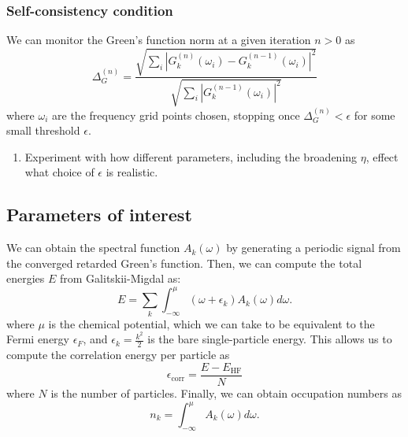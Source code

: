 \subsubsection{Self-consistency condition}
We can monitor the Green's function norm at a given iteration $n>0$ as
\begin{equation}
    \Delta_G^{(n)} = \frac{\sqrt{\sum_i |G_{k}^{(n)}(\omega_i) - G_{k}^{(n-1)}(\omega_i)|^2}}{\sqrt{\sum_i |G_{k}^{(n-1)}(\omega_i)|^2}}
\end{equation}
where $\omega_i$ are the frequency grid points chosen, stopping once $\Delta_G^{(n)} < \epsilon$ for some small threshold $\epsilon$.
\begin{enumerate}
    \item Experiment with how different parameters, including the broadening $\eta$, effect what choice of $\epsilon$ is realistic.
\end{enumerate}
\subsection{Parameters of interest}
We can obtain the spectral function $A_{k}(\omega)$ by generating a periodic signal from the converged retarded Green's function. Then, we can compute the total energies $E$ from Galitskii-Migdal as:
\begin{equation}
    E=\sum_k \int_{-\infty}^\mu\left(\omega+\epsilon_k\right) A_k(\omega) d \omega.
\end{equation}
where $\mu$ is the chemical potential, which we can take to be equivalent to the Fermi energy $\epsilon_F$, and $\epsilon_k=\frac{k^2}{2}$ is the bare single-particle energy. This allows us to compute the correlation energy per particle as 
\begin{equation}
    \epsilon_{\text{corr}} = \frac{E-E_{\text{HF}}}{N}
\end{equation}
where $N$ is the number of particles. Finally, we can obtain occupation numbers as \begin{equation}
    n_k = \int_{-\infty}^\mu A_k(\omega) d\omega.
\end{equation}
